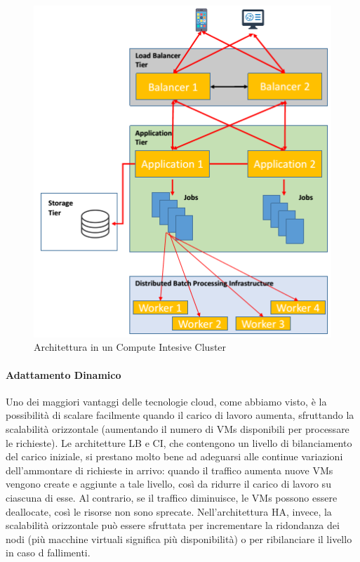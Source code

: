 \documentclass{article}
\begin{document}
\begin{figure}[H]
\centering
\includegraphics[scale=0.6]{img/CICluster_Arch.png}
\caption{Architettura in un Compute Intesive Cluster}
\end{figure}

\paragraph{Adattamento Dinamico}
Uno dei maggiori vantaggi delle tecnologie cloud, come abbiamo visto, è la possibilità di scalare facilmente quando il carico di lavoro aumenta, sfruttando la scalabilità orizzontale (aumentando il numero di VMs disponibili per processare le richieste).
Le architetture LB e CI, che contengono un livello di bilanciamento del carico iniziale, si prestano molto bene ad adeguarsi alle continue variazioni dell’ammontare di richieste in arrivo: quando il traffico aumenta nuove VMs vengono create e aggiunte a tale livello, così da ridurre il carico di lavoro su ciascuna di esse. Al contrario, se il traffico diminuisce, le VMs possono essere deallocate, così le risorse non sono sprecate.
Nell’architettura HA, invece, la scalabilità orizzontale può essere sfruttata per incrementare la ridondanza dei nodi (più macchine virtuali significa più disponibilità) o per ribilanciare il livello in caso d fallimenti.
\end{document}
